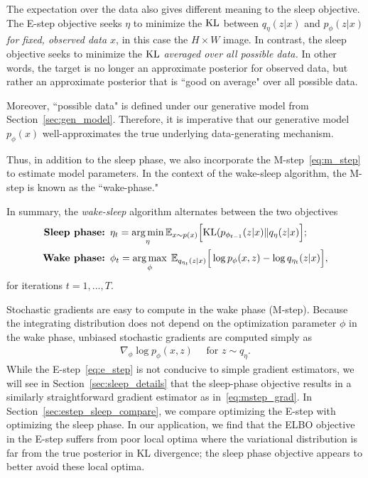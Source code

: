 The expectation over the data also gives different meaning to the sleep objective. The E-step objective seeks $\eta$ to minimize the $\textrm{KL}$ between $q_\eta(z | x)$ and $p_\phi(z | x)$ {\itshape for fixed, observed data $x$},
in this case the $H\times W$ image. In contrast, the sleep objective seeks to minimize the $\textrm{KL}$ {\itshape averaged over all possible data. } In other words, the target is no longer an approximate posterior for observed data, but rather an approximate posterior that is ``good on average" over all possible data.

Moreover, ``possible data" is defined under our generative model from Section~\ref{sec:gen_model}. Therefore, it is imperative that our generative model $p_\phi(x)$ well-approximates the true underlying data-generating mechanism. 

Thus, in addition to the sleep phase, we also incorporate the M-step~\eqref{eq:m_step} to estimate model parameters. In the context of the wake-sleep algorithm, the M-step is known as the ``wake-phase."

In summary, the {\itshape wake-sleep} algorithm alternates between the two objectives 
\begin{align}
    \text{{\bf Sleep phase: }} & 
    \eta_{t} = \operatorname*{arg\,min}_{\eta} \mathbb{E}_{x \sim p(x)}\Big[\textrm{KL}(p_{\phi_{t-1}}(z | x) \| q_\eta(z | x)\Big]
    \label{eq:sleep_phase_summary}; 
    \\
    \text{{\bf Wake phase: }} & \phi_{t} = \operatorname*{arg\,max}_{\phi}\; \mathbb{E}_{q_{\eta_t}(z | x)}\Big[\log p_{\phi}(x, z) - \log q_{\eta_t}(z | x)\Big],
    \label{eq:wake_phase_summary}
\end{align} 
for iterations $t = 1, ..., T$. 

Stochastic gradients are easy to compute in the wake phase (M-step). Because the integrating distribution does not depend on the optimization parameter $\phi$ in the wake phase, unbiased stochastic gradients are computed simply as 
\begin{align}
    \nabla_\phi \log p_\phi(x, z) \quad \text{ for } z\sim q_\eta. 
    \label{eq:mstep_grad}
\end{align}
While the E-step~\eqref{eq:e_step} is not conducive to simple gradient estimators, we will see in Section~\ref{sec:sleep_details} that the sleep-phase objective
results in a similarly straightforward gradient estimator as in~\eqref{eq:mstep_grad}. 
In Section~\ref{sec:estep_sleep_compare}, 
we compare optimizing the E-step with optimizing the sleep phase. In our application, we find that
the ELBO objective in the E-step suffers from poor local optima where the variational distribution is far from the true posterior in KL divergence; the sleep phase objective appears to better avoid these local optima. 

